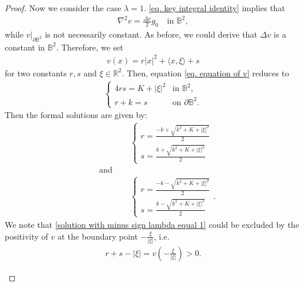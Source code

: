 \documentclass[11pt,a4paper,twoside]{amsart}
\newtheorem{sketch proof}{Sketch of the proof}[section]
\begin{document}
\begin{proof}
 Now we consider the case $\lambda=1$. \cref{eq. key integral identity} implies that
\begin{align*}
    \nabla^2 v=\frac{\Delta v}{2}g_0\quad 
    \text{in }\mathbb{B}^2,
\end{align*}
while $v|_{\partial\mathbb{B}^2}$ is not necessarily constant. As before, we could derive that $\Delta v$ is a constant in $\mathbb{B}^2$. Therefore, we set
\begin{align*}
    v(x)=r|x|^2+\langle x,\xi\rangle+s
\end{align*}
for two constants $r,s$ and $\xi\in\mathbb{R}^2$. Then, equation \cref{eq. equation of v} reduces to 
\begin{align*}
    \begin{cases}
        4rs=K+|\xi|^2 
        &\text{in }\mathbb{B}^2,\\[2mm]
        r+k=s&\text{on }\partial\mathbb{B}^2.
    \end{cases}
\end{align*}
Then the formal solutions are given by: 
\begin{align}
    &\begin{cases}
        r=\frac{-k+\sqrt{k^2+K+|\xi|^2}}{2}\\[2mm]
        s=\frac{k+\sqrt{k^2+K+|\xi|^2}}{2}
    \end{cases}\label{solution with plus sign lambda equal 1}\\
    \quad \text{and }\quad\nonumber\\
    &\begin{cases}
        r=\frac{-k-\sqrt{k^2+K+|\xi|^2}}{2}\\[2mm]
        s=\frac{k-\sqrt{k^2+K+|\xi|^2}}{2}
    \end{cases}.\label{solution with minus sign lambda equal 1}
\end{align}
We note that \cref{solution with minus sign lambda equal 1} could be excluded by the positivity of $v$ at the boundary point $-\frac{\xi}{|\xi|}$, i.e.
\begin{align*}
    r+s-|\xi|=v\left(-\frac{\xi}{|\xi|}\right)>0.
\end{align*}

\begin{itemize}


\end{itemize}
\end{proof}
\end{document}

